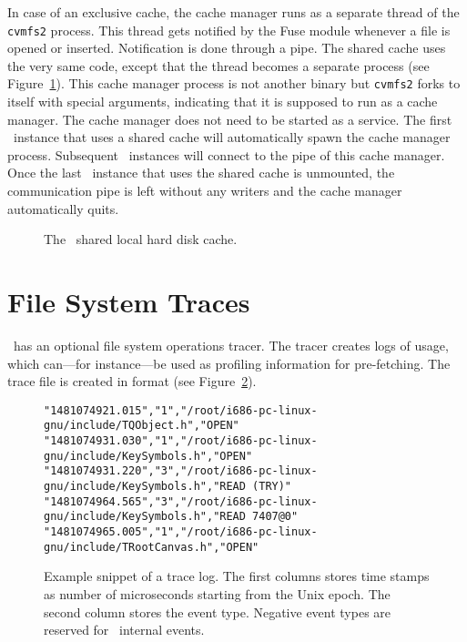 In case of an exclusive cache, the cache manager runs as a separate thread of the \texttt{cvmfs2} process.
This thread gets notified by the Fuse module whenever a file is opened or inserted.  
Notification is done through a pipe.  
The shared cache uses the very same code, except that the thread becomes a separate process (see Figure~\ref{fig:sharedcache}).  
This cache manager process is not another binary but \texttt{cvmfs2} forks to itself with special arguments, indicating that it is supposed to run as a cache manager.  
The cache manager does not need to be started as a service.  
The first \cvmfs\ instance that uses a shared cache will automatically spawn the cache manager process.  
Subsequent \cvmfs\ instances will connect to the pipe of this cache manager.
Once the last \cvmfs\ instance that uses the shared cache is unmounted, the communication pipe is left without any writers and the cache manager automatically quits.

\begin{figure}
	\centering
	
	\caption{The \cvmfs\ shared local hard disk cache.}
	\label{fig:sharedcache}
\end{figure}


\section{File System Traces}
\cvmfs\ has an optional file system operations tracer.
The tracer creates logs of usage, which can---for instance---be used as profiling information for pre-fetching.
The trace file is created in  format (see Figure~\ref{fig:traces}).
\begin{figure}
	\centering
	\begin{verbatim}
"1481074921.015","1","/root/i686-pc-linux-gnu/include/TQObject.h","OPEN"
"1481074931.030","1","/root/i686-pc-linux-gnu/include/KeySymbols.h","OPEN"
"1481074931.220","3","/root/i686-pc-linux-gnu/include/KeySymbols.h","READ (TRY)"
"1481074964.565","3","/root/i686-pc-linux-gnu/include/KeySymbols.h","READ 7407@0"
"1481074965.005","1","/root/i686-pc-linux-gnu/include/TRootCanvas.h","OPEN"
	\end{verbatim}
	\caption{Example snippet of a trace log. The first columns stores time stamps as number of microseconds starting from the Unix epoch. The second column stores the event type. Negative event types are reserved for \cvmfs\ internal events.}
	\label{fig:traces}
\end{figure}

